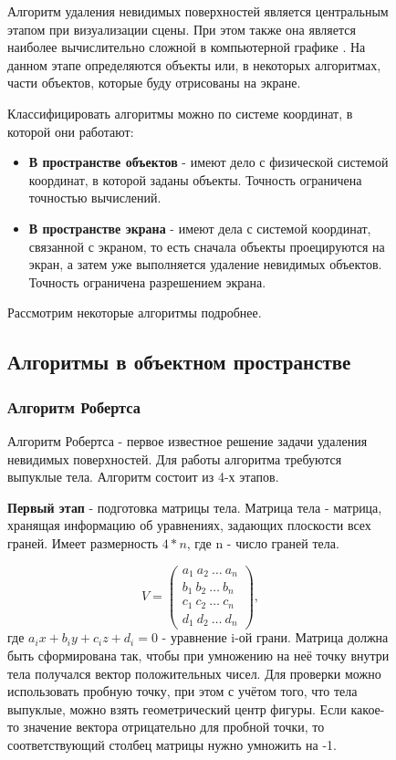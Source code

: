 \begin{figure}[h]
Алгоритм удаления невидимых поверхностей является
центральным этапом при визуализации сцены. При этом также она является наиболее вычислительно сложной в компьютерной графике \cite{rodgers}. На данном этапе определяются объекты или, в некоторых алгоритмах, части объектов, которые буду отрисованы на экране.

Классифицировать алгоритмы можно по системе координат, в которой они работают:
\begin{itemize}
	\item\textbf{В пространстве объектов} - имеют дело с физической системой координат, в которой заданы объекты. Точность ограничена точностью вычислений.
	\item\textbf{В пространстве экрана} - имеют дела с системой координат, связанной с экраном, то есть сначала объекты проецируются на экран, а затем уже выполняется удаление невидимых объектов. Точность ограничена разрешением экрана.
\end{itemize}
Рассмотрим некоторые алгоритмы подробнее.

\subsection{Алгоритмы в объектном пространстве}
\subsubsection{Алгоритм Робертса}
Алгоритм Робертса - первое известное решение задачи удаления невидимых поверхностей. Для работы алгоритма требуются выпуклые тела. Алгоритм состоит из 4-х этапов.

\textbf{Первый этап} - подготовка матрицы тела. Матрица тела - матрица, хранящая информацию об уравнениях, задающих плоскости всех граней. Имеет размерность $4*n$, где n - число граней тела.

\begin{equation}
	\label{eq:body_matrix}
	V = \begin{pmatrix}
		a_1\ a_2\ \dots\ a_n \\
		b_1\ b_2\ \dots\ b_n \\
		c_1\ c_2\ \dots\ c_n \\
		d_1\ d_2\ \dots\ d_n 
	\end{pmatrix},
\end{equation}
где $ a_ix + b_iy + c_iz + d_i = 0 $ - уравнение i-ой грани. Матрица должна быть сформирована так, чтобы при умножению на неё точку внутри тела получался вектор положительных чисел. Для проверки можно использовать пробную точку, при этом с учётом того, что тела выпуклые, можно взять геометрический центр фигуры. Если какое-то значение вектора отрицательно для пробной точки, то соответствующий столбец матрицы нужно умножить на -1.


\end{figure}
